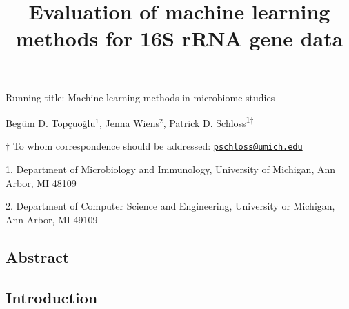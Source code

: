 \documentclass[11pt,]{article}
\title{\textbf{Evaluation of machine learning methods for 16S rRNA gene data}}
\author{}
\date{}
\begin{document}
\maketitle

\vspace{35mm}

Running title: Machine learning methods in microbiome studies

\vspace{35mm}

Begüm D. Topçuoğlu\({^1}\), Jenna Wiens\({^2}\), Patrick D.
Schloss\textsuperscript{1\(\dagger\)}

\vspace{40mm}

\(\dagger\) To whom correspondence should be addressed:
\href{mailto:pschloss@umich.edu}{\nolinkurl{pschloss@umich.edu}}

1. Department of Microbiology and Immunology, University of Michigan,
Ann Arbor, MI 48109

2. Department of Computer Science and Engineering, University or
Michigan, Ann Arbor, MI 49109

\newpage

\linenumbers

\subsection{Abstract}\label{abstract}

\newpage

\subsection{Introduction}\label{introduction}
\end{document}
